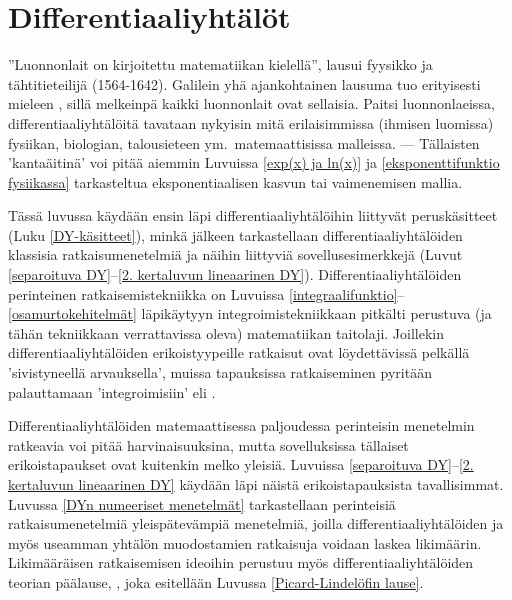 \chapter{Differentiaaliyhtälöt}

''Luonnonlait on kirjoitettu matematiikan kielellä'', lausui fyysikko ja tähtitieteilijä
%
 (1564-1642). Galilein yhä ajankohtainen lausuma tuo erityisesti mieleen
, sillä melkeinpä kaikki luonnonlait ovat sellaisia. Paitsi
luonnonlaeissa, differentiaaliyhtälöitä tavataan nykyisin mitä erilaisimmissa (ihmisen
luomissa) fysiikan, biologian, talousieteen ym.\ matemaattisissa malleissa. --- Tällaisten
'kantaäitinä' voi pitää aiemmin Luvuissa \ref{exp(x) ja ln(x)} ja 
\ref{eksponenttifunktio fysiikassa} tarkasteltua eksponentiaalisen kasvun tai vaimenemisen
mallia.

Tässä luvussa käydään ensin läpi differentiaaliyhtälöihin liittyvät peruskäsitteet
(Luku \ref{DY-käsitteet}), minkä jälkeen tarkastellaan differentiaaliyhtälöiden klassisia
ratkaisumenetelmiä ja näihin liittyviä sovellusesimerkkejä
(Luvut \ref{separoituva DY}--\ref{2. kertaluvun lineaarinen DY}). Differentiaaliyhtälöiden
perinteinen ratkaisemistekniikka on Luvuissa \ref{integraalifunktio}--\ref{osamurtokehitelmät}
läpikäytyyn integroimistekniikkaan pitkälti perustuva (ja tähän tekniikkaan verrattavissa oleva)
matematiikan taitolaji. Joillekin differentiaaliyhtälöiden erikoistyypeille ratkaisut ovat 
löydettävissä pelkällä 'sivistyneellä arvauksella', muissa tapauksissa ratkaiseminen pyritään
palauttamaan 'integroimisiin' eli .

Differentiaaliyhtälöiden matemaattisessa paljoudessa perinteisin menetelmin ratkeavia voi pitää
harvinaisuuksina, mutta sovelluksissa tällaiset erikoistapaukset ovat kuitenkin melko yleisiä.
Luvuissa \ref{separoituva DY}--\ref{2. kertaluvun lineaarinen DY} käydään läpi näistä 
erikoistapauksista tavallisimmat. Luvussa \ref{DYn numeeriset menetelmät} tarkastellaan
perinteisiä ratkaisumenetelmiä yleispätevämpiä  menetelmiä, joilla
differentiaaliyhtälöiden ja myös useamman yhtälön muodostamien 
 ratkaisuja voidaan laskea likimäärin. Likimääräisen
ratkaisemisen ideoihin perustuu myös differentiaaliyhtälöiden teorian päälause,
, joka esitellään Luvussa \ref{Picard-Lindelöfin lause}.
